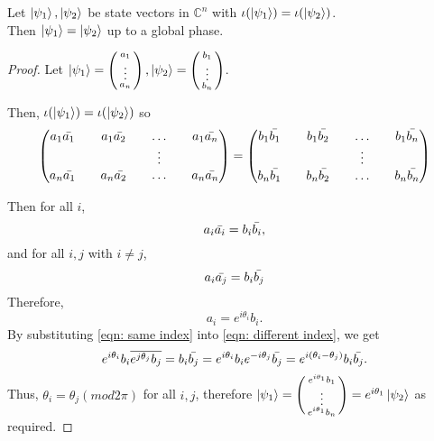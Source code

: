 \begin{lemma}
\label{lemma state into density}
Let $\ket{\psi_1}, \ket{\psi_2}$ be state vectors in ${\mathbb{C}}^n$ with $\iota({\ket{\psi_1}})=\iota(\ket{\psi_2})$.\\
Then $\ket{\psi_1}=\ket{\psi_2}$ up to a global phase.
\end{lemma}
\begin{proof}
Let $\ket{\psi_1}=\left(\begin{smallmatrix}a_1\\ \vdots \\ a_n\end{smallmatrix}\right), \ket{\psi_2}=\left(\begin{smallmatrix}b_1\\ \vdots \\ b_n\end{smallmatrix}\right)$. 
\bigskip

Then, $\iota({\ket{\psi_1}})=\iota(\ket{\psi_2})$ so
\begin{equation*}
\begin{pmatrix}
a_1 \Bar{a_1} && a_1 \Bar{a_2} && \hdots && a_1 \Bar{a_n}\\
&& && \vdots && \\
a_n \Bar{a_1} && a_n \Bar{a_2} && \hdots && a_n \Bar{a_n}\\              
\end{pmatrix}=\begin{pmatrix}
b_1 \Bar{b_1} && b_1 \Bar{b_2} && \hdots && b_1 \Bar{b_n}\\
&& && \vdots && \\
b_n \Bar{b_1} && b_n \Bar{b_2} && \hdots && b_n \Bar{b_n}\\ 
\end{pmatrix}
\end{equation*}

\noindent
Then for all $i$, $$a_i \Bar{a_i}=b_i \Bar{b_i},$$
and for all $i, j$ with $i \ne j$, 
\begin{equation}\label{eqn: different index}
    a_i \Bar{a_j}=b_i \Bar{b_j}
\end{equation}
Therefore, 
\begin{equation}\label{eqn: same index}
   a_i=e^{i\theta_i}b_i. 
\end{equation}
By substituting \eqref{eqn: same index} into \eqref{eqn: different index}, we get 
\begin{equation}
    e^{i\theta_i}b_i \overline{e^{j\theta_j}b_j}=b_i \Bar{b_j}
=e^{i\theta_i}b_i e^{-i\theta_j}\Bar{b_j}=e^{i(\theta_i-\theta_j)}b_i \Bar{b_j}.
\end{equation}
Thus, $\theta_i=\theta_j (mod 2\pi)$ for all $i,j$, 
therefore $\ket{\psi_1}=\left(\begin{smallmatrix}e^{i\theta_1}b_1 \\ \vdots \\ e^{i\theta_1}b_n\end{smallmatrix}\right)=e^{i\theta_1}\ket{\psi_2}$ as required.
\end{proof}

